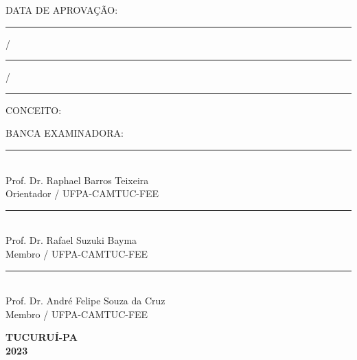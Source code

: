 			\begin{center}
   			\begin{flushleft}
                    DATA DE APROVAÇÃO: \noindent\rule{0.04\textwidth}{0.1pt} / \noindent\rule{0.04\textwidth}{0.1pt} / \noindent\rule{0.04\textwidth}{0.1pt}
			\end{flushleft}
			\begin{flushleft}
                    CONCEITO:
			\end{flushleft}
   			\begin{flushleft}
			     BANCA EXAMINADORA:	
			\end{flushleft}
		  
			\vspace{0.45cm}
		
			\par\noindent\rule{0.7\textwidth}{0.2pt}\\ \vspace{-0.2cm}
			Prof. Dr. Raphael Barros Teixeira\\ \vspace{-0.2cm}
			{\small Orientador / UFPA-CAMTUC-FEE}
			\vspace{0.7cm}
			
			\par\noindent\rule{0.7\textwidth}{0.2pt}\\ \vspace{-0.2cm}
			Prof. Dr. Rafael Suzuki Bayma\\ \vspace{-0.2cm}
			{\small Membro / UFPA-CAMTUC-FEE}
			\vspace{0.7cm}

   		  \par\noindent\rule{0.7\textwidth}{0.2pt}\\ \vspace{-0.2cm}
			Prof. Dr. André Felipe Souza da Cruz\\ \vspace{-0.2cm}
			{\small Membro / UFPA-CAMTUC-FEE}
			\vspace{0.7cm}

                \vfill\vfill
			\textbf{TUCURUÍ-PA}\\			
			\textbf{2023}
			
	\end{center}
